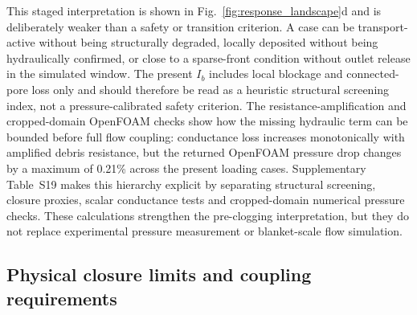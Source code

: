 \documentclass[preprint,12pt,authoryear]{elsarticle}
\newcommand{\Ib}{$I_b$\xspace}
\begin{document}
This staged interpretation is shown in Fig.~\ref{fig:response_landscape}d and is deliberately weaker than a safety or transition criterion. A case can be transport-active without being structurally degraded, locally deposited without being hydraulically confirmed, or close to a sparse-front condition without outlet release in the simulated window. The present \Ib includes local blockage and connected-pore loss only and should therefore be read as a heuristic structural screening index, not a pressure-calibrated safety criterion. The resistance-amplification and cropped-domain OpenFOAM checks show how the missing hydraulic term can be bounded before full flow coupling: conductance loss increases monotonically with amplified debris resistance, but the returned OpenFOAM pressure drop changes by a maximum of 0.21\% across the present loading cases. Supplementary Table~S19 makes this hierarchy explicit by separating structural screening, closure proxies, scalar conductance tests and cropped-domain numerical pressure checks. These calculations strengthen the pre-clogging interpretation, but they do not replace experimental pressure measurement or blanket-scale flow simulation.

\subsection{Physical closure limits and coupling requirements}
\end{document}
